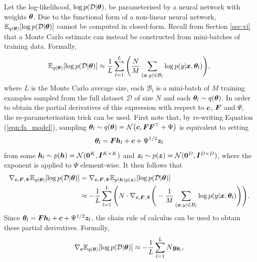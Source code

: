 \documentclass[10pt]{article} %
\begin{document}
Let the log-likelihood, $\log p(\mathcal{D} | {\bm{\theta}})$, be parameterised by a neural network with weights ${\bm{\theta}}$. Due to the functional form of a non-linear neural network, $\mathbb{E}_{q({\bm{\theta}})} [\log p(\mathcal{D} | {\bm{\theta}})]$ cannot be computed in closed-form. Recall from Section \ref{sec:vi} that a Monte Carlo estimate can instead be constructed from mini-batches of training data. Formally, 
\begin{equation}
	 \mathbb{E}_{q({\bm{\theta}})} [\log p(\mathcal{D} | {\bm{\theta}})]
	\approx \frac{1}{L} \sum_{l=1}^{L} \Bigg( \frac{N}{M} \sum_{({\bm{x}}, y) \in \mathcal{B}_l} \log p(y | {\bm{x}}, {\bm{\theta}}_l) \Bigg),
\end{equation}
where $L$ is the Monte Carlo average size, each $\mathcal{B}_l$ is a mini-batch of $M$ training examples sampled from the full dataset $\mathcal{D}$ of size $N$ and each ${\bm{\theta}}_l \sim q({\bm{\theta}})$. In order to obtain the partial derivatives of this expression with respect to ${\bm{c}}$, ${\bm{F}}$ and $\Psi$, the re-parameterisation trick \citep{goodfellow2016} can be used. First note that, by re-writing Equation (\ref{eqn:fa_model}), sampling ${\bm{\theta}}_l \sim q({\bm{\theta}}) = \mathcal{N}\big({\bm{c}}, {\bm{F}} {\bm{F}}^{\top} + \Psi\big)$ is equivalent to setting  
\begin{equation}\label{eqn:fa_reparam_trick}
	{\bm{\theta}}_l = {\bm{F}} {\bm{h}}_l + {\bm{c}} + \Psi^{1/2} {\bm{z}}_l
\end{equation}
from some ${\bm{h}}_l \sim p({\bm{h}}) = \mathcal{N}(\bm{0}^K, {\bm{I}}^{K \times K})$ and ${\bm{z}}_l \sim p({\bm{z}}) = \mathcal{N}(\bm{0}^D, {\bm{I}}^{D \times D})$, where the exponent is applied to $\Psi$ element-wise. 
It then follows that
\begin{align}
\begin{split}
\label{eqn:expected_grad_log_likelihood}
	\nabla_{{\bm{c}}, {\bm{F}}, \Psi} \mathbb{E}_{q({\bm{\theta}})} [\log p(\mathcal{D} | {\bm{\theta}})]
	& = \nabla_{{\bm{c}}, {\bm{F}}, \Psi} \mathbb{E}_{p({\bm{h}})p({\bm{z}})} [\log p(\mathcal{D} | {\bm{\theta}})] \\
	& \approx -\frac{1}{L} \sum_{l=1}^{L} \Bigg(N \cdot \nabla_{{\bm{c}}, {\bm{F}}, \Psi} \Bigg( -\frac{1}{M} \sum_{({\bm{x}}, y) \in \mathcal{B}_l} \log p(y | {\bm{x}}, {\bm{\theta}}_l) \Bigg) \Bigg).
\end{split}
\end{align}
Since ${\bm{\theta}}_l = {\bm{F}} {\bm{h}}_l + {\bm{c}} + \Psi^{1/2} {\bm{z}}_l$, the chain rule of calculus can be used to obtain these partial derivatives. Formally,
\begin{equation}
	 \nabla_{\bm{c}} \mathbb{E}_{q({\bm{\theta}})} [\log p(\mathcal{D} | {\bm{\theta}})]
	 \approx -\frac{1}{L} \sum_{l=1}^{L} N {\bm{g}}_{{\bm{\theta}}_l},
\end{equation}
\end{document}
